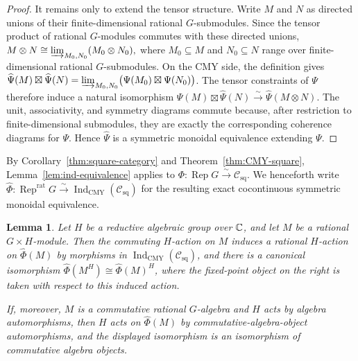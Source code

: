 \documentclass[10pt,a4paper]{amsart}
\numberwithin{equation}{section} \newtheorem{thm}{Theorem}[section] \newtheorem{lem}[thm]{Lemma} \newtheorem{ex}[thm]{Example} \newtheorem{prop}[thm]{Proposition} \newtheorem{cor}[thm]{Corollary} \newtheorem{defi}[thm]{Definition} \newtheorem{rmk}[thm]{Remark} \newtheorem{notation}[thm]{Notation}
\newcommand{\Rep}{\operatorname{Rep}}
\newcommand{\Csq}{\mathcal C_{\mathrm{sq}}}
\newcommand{\IndCMY}{\operatorname{Ind}_{\mathrm{CMY}}}
\begin{document}
\begin{proof}
It remains only to extend the tensor structure. Write $M$ and $N$ as directed unions of their finite-dimensional rational $G$-submodules. Since the tensor product of rational $G$-modules commutes with these directed unions, \(M\otimes N\cong\varinjlim_{M_0,N_0}(M_0\otimes N_0),\) where $M_0\subseteq M$ and $N_0\subseteq N$ range over finite-dimensional rational $G$-submodules. On the CMY side, the definition gives \(\widehat\Psi(M)\boxtimes\widehat\Psi(N) = \varinjlim_{M_0,N_0} \bigl(\Psi(M_0)\boxtimes\Psi(N_0)\bigr)\). The tensor constraints of $\Psi$ therefore induce a natural isomorphism \(\widehat\Psi(M)\boxtimes\widehat\Psi(N) \overset{\sim}{\longrightarrow} \widehat\Psi(M\otimes N)\). The unit, associativity, and symmetry diagrams commute because, after restriction to finite-dimensional submodules, they are exactly the corresponding coherence diagrams for $\Psi$. Hence $\widehat\Psi$ is a symmetric monoidal equivalence extending $\Psi$.
\end{proof}

By Corollary~\ref{thm:square-category} and Theorem~\ref{thm:CMY-square}, Lemma~\ref{lem:ind-equivalence} applies to \(\Phi:\Rep G\overset\sim\longrightarrow\Csq\). We henceforth write \(\widehat\Phi:\Rep^{\mathrm{rat}}G\overset\sim\longrightarrow\IndCMY(\Csq)\) for the resulting exact cocontinuous symmetric monoidal equivalence.

\begin{lem}\label{lem:ind-equivariance}
Let $H$ be a reductive algebraic group over $\mathbb{C}$, and let $M$ be a rational $G\times H$-module. Then the commuting $H$-action on $M$ induces a rational $H$-action on $\widehat\Phi(M)$ by morphisms in $\IndCMY(\Csq)$, and there is a canonical isomorphism \(\widehat\Phi(M^H)\cong\widehat\Phi(M)^H\), where the fixed-point object on the right is taken with respect to this induced action.

If, moreover, $M$ is a commutative rational $G$-algebra and $H$ acts by algebra automorphisms, then $H$ acts on $\widehat\Phi(M)$ by commutative-algebra-object automorphisms, and the displayed isomorphism is an isomorphism of commutative algebra objects.
\end{lem}
\end{document}
